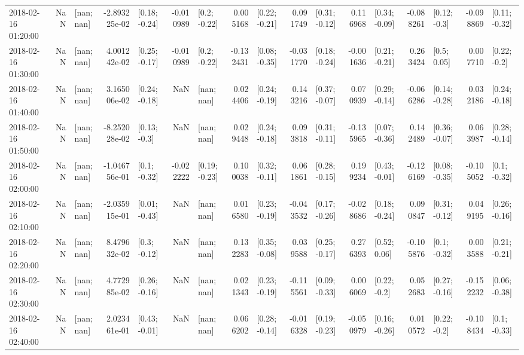 \begin{tabular}{lrlrlrlrlrlrlrlrl}
2018-02-16 01:20:00 &       NaN &      [nan; nan] & -2.893225e-02 &   [0.18; -0.24] & -0.010989 &    [0.2; -0.22] &  0.005168 &   [0.22; -0.21] &  0.091749 &   [0.31; -0.12] &  0.116968 &   [0.34; -0.09] & -0.088261 &    [0.12; -0.3] & -0.098869 &   [0.11; -0.32] \\
2018-02-16 01:30:00 &       NaN &      [nan; nan] &  4.001242e-02 &   [0.25; -0.17] & -0.010989 &    [0.2; -0.22] & -0.132431 &   [0.08; -0.35] & -0.031770 &   [0.18; -0.24] & -0.001636 &   [0.21; -0.21] &  0.263424 &     [0.5; 0.05] &  0.007710 &    [0.22; -0.2] \\
2018-02-16 01:40:00 &       NaN &      [nan; nan] &  3.165006e-02 &   [0.24; -0.18] &       NaN &      [nan; nan] &  0.024406 &   [0.24; -0.19] &  0.143216 &   [0.37; -0.07] &  0.070939 &   [0.29; -0.14] & -0.066286 &   [0.14; -0.28] &  0.032186 &   [0.24; -0.18] \\
2018-02-16 01:50:00 &       NaN &      [nan; nan] & -8.252028e-02 &    [0.13; -0.3] &       NaN &      [nan; nan] &  0.029448 &   [0.24; -0.18] &  0.093818 &   [0.31; -0.11] & -0.135965 &   [0.07; -0.36] &  0.142489 &   [0.36; -0.07] &  0.063987 &   [0.28; -0.14] \\
2018-02-16 02:00:00 &       NaN &      [nan; nan] & -1.046756e-01 &    [0.1; -0.32] & -0.022222 &   [0.19; -0.23] &  0.100038 &   [0.32; -0.11] &  0.061861 &   [0.28; -0.15] &  0.199234 &   [0.43; -0.01] & -0.126169 &   [0.08; -0.35] & -0.105052 &    [0.1; -0.32] \\
2018-02-16 02:10:00 &       NaN &      [nan; nan] & -2.035915e-01 &   [0.01; -0.43] &       NaN &      [nan; nan] &  0.016580 &   [0.23; -0.19] & -0.043532 &   [0.17; -0.26] & -0.028686 &   [0.18; -0.24] &  0.090847 &   [0.31; -0.12] &  0.049195 &   [0.26; -0.16] \\
2018-02-16 02:20:00 &       NaN &      [nan; nan] &  8.479632e-02 &    [0.3; -0.12] &       NaN &      [nan; nan] &  0.132283 &   [0.35; -0.08] &  0.039588 &   [0.25; -0.17] &  0.276393 &    [0.52; 0.06] & -0.105876 &    [0.1; -0.32] &  0.003588 &   [0.21; -0.21] \\
2018-02-16 02:30:00 &       NaN &      [nan; nan] &  4.772985e-02 &   [0.26; -0.16] &       NaN &      [nan; nan] &  0.021343 &   [0.23; -0.19] & -0.115561 &   [0.09; -0.33] &  0.006069 &    [0.22; -0.2] &  0.052683 &   [0.27; -0.16] & -0.152232 &   [0.06; -0.38] \\
2018-02-16 02:40:00 &       NaN &      [nan; nan] &  2.023461e-01 &   [0.43; -0.01] &       NaN &      [nan; nan] &  0.066202 &   [0.28; -0.14] & -0.016328 &   [0.19; -0.23] & -0.050979 &   [0.16; -0.26] &  0.010572 &    [0.22; -0.2] & -0.108434 &    [0.1; -0.33] \\

\end{tabular}
